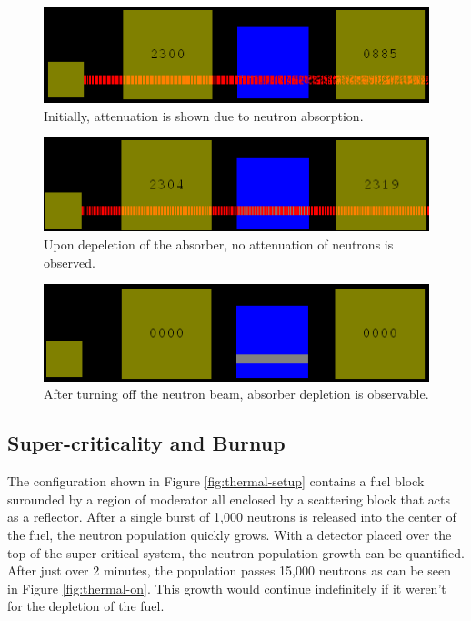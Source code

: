 \documentclass{anstrans}
\begin{document}
\begin{figure}
    \centering
    \includegraphics[width=\columnwidth]{atten-on.png}
    \caption{Initially, attenuation is shown due to neutron absorption.}
    \label{fig:atten-on}
\end{figure}

\begin{figure}
    \centering
    \includegraphics[width=\columnwidth]{atten-done.png}
    \caption{Upon depeletion of the absorber, no attenuation of neutrons is observed.}
    \label{fig:atten-done}
\end{figure}

\begin{figure}
    \centering
    \includegraphics[width=\columnwidth]{atten-off.png}
    \caption{After turning off the neutron beam, absorber depletion is observable.}
    \label{fig:atten-off}
\end{figure}

\subsection{Super-criticality and Burnup}

The configuration shown in Figure \ref{fig:thermal-setup} contains a fuel
block surounded by a region of moderator all enclosed by a scattering block
that acts as a reflector.  After a single burst of 1,000 neutrons is released
into the center of the fuel, the neutron population quickly grows.  With a
detector placed over the top of the super-critical system, the neutron
population growth can be quantified. After just over 2 minutes, the population
passes 15,000 neutrons as can be seen in Figure \ref{fig:thermal-on}.  This
growth would continue indefinitely if it weren't for the depletion of the
fuel.
\end{document}
